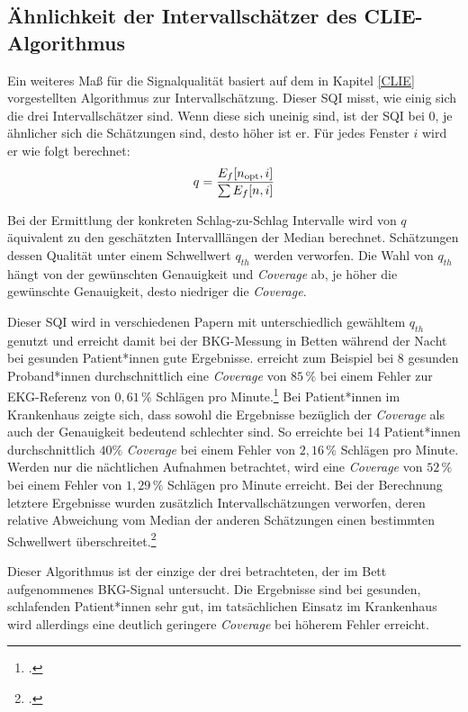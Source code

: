 	\subsection{Ähnlichkeit der Intervallschätzer des CLIE-Algorithmus}\label{brueserQI}
	
	Ein weiteres Maß für die Signalqualität basiert auf dem in Kapitel \ref{CLIE} vorgestellten Algorithmus zur Intervallschätzung. Dieser \acl{SQI} misst, wie einig sich die drei Intervallschätzer sind. Wenn diese sich uneinig sind, ist der \ac{SQI} bei 0, je ähnlicher sich die Schätzungen sind, desto höher ist er. Für jedes Fenster $i$ wird er wie folgt berechnet: \[ q = \frac{E_f[n\textsubscript{opt}, i]}{\sum E_f[n, i]} \]
	
	Bei der Ermittlung der konkreten Schlag-zu-Schlag Intervalle wird von $q$ äquivalent zu den geschätzten Intervalllängen der Median berechnet. Schätzungen dessen Qualität unter einem Schwellwert $q_{th}$ werden verworfen. Die Wahl von $q_{th}$ hängt von der gewünschten Genauigkeit und \textit{Coverage} ab, je höher die gewünschte Genauigkeit, desto niedriger die \textit{Coverage}.
	
	Dieser \ac{SQI} wird in verschiedenen Papern mit unterschiedlich gewähltem $q_{th}$ genutzt und erreicht damit bei der \ac{BKG}-Messung in Betten während der Nacht bei gesunden Patient*innen gute Ergebnisse. \citeauthor{Bruser2013} erreicht zum Beispiel bei 8 gesunden Proband*innen durchschnittlich eine \textit{Coverage} von $85\,\%$ bei einem Fehler zur \ac{EKG}-Referenz von $0{,}61\,\%$ Schlägen pro Minute.\footcite[Vgl.][]{Bruser2013} Bei Patient*innen im Krankenhaus zeigte sich, dass sowohl die Ergebnisse bezüglich der \textit{Coverage} als auch der Genauigkeit bedeutend schlechter sind. So erreichte \citeauthor{HoogAntink2020} bei 14 Patient*innen durchschnittlich $40 \%$ \textit{Coverage} bei einem Fehler von $2{,}16\,\%$ Schlägen pro Minute. Werden nur die nächtlichen Aufnahmen betrachtet, wird eine \textit{Coverage} von $52\,\%$ bei einem Fehler von $1{,}29\,\%$ Schlägen pro Minute erreicht. Bei der Berechnung letztere Ergebnisse wurden zusätzlich Intervallschätzungen verworfen, deren relative Abweichung vom Median der anderen Schätzungen einen bestimmten Schwellwert überschreitet.\footcite[Vgl.][]{HoogAntink2020}
	
	Dieser Algorithmus ist der einzige der drei betrachteten, der im Bett aufgenommenes \ac{BKG}-Signal untersucht. Die Ergebnisse sind bei gesunden, schlafenden Patient*innen sehr gut, im tatsächlichen Einsatz im Krankenhaus wird allerdings eine deutlich geringere \textit{Coverage} bei höherem Fehler erreicht.
	

